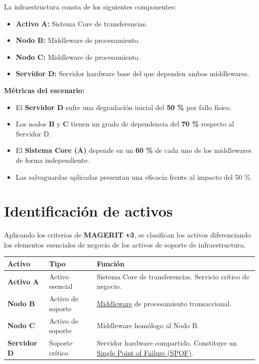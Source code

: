 \documentclass[11pt,a4paper]{article}
\begin{document}
La infraestructura consta de los siguientes componentes:
\begin{itemize}
    \item \textbf{Activo A:} Sistema Core de transferencias.
    \item \textbf{Nodo B:} Middleware de procesamiento.
    \item \textbf{Nodo C:} Middleware de procesamiento.
    \item \textbf{Servidor D:} Servidor hardware base del que dependen ambos middlewares.
\end{itemize}

\textbf{Métricas del escenario:}
\begin{itemize}
    \item El \textbf{Servidor D} sufre una degradación inicial del \textbf{50 \%} por fallo físico.
    \item Los nodos \textbf{B} y \textbf{C} tienen un grado de dependencia del \textbf{70 \%} respecto al Servidor D.
    \item El \textbf{Sistema Core (A)} depende en un \textbf{60 \%} de cada uno de los middlewares de forma independiente.
    \item Las salvaguardas aplicadas presentan una eficacia frente al impacto del 50 \%.
\end{itemize}

\pagebreak

\section*{Identificación de activos}
Aplicando los criterios de \textbf{MAGERIT v3}, se clasifican los activos diferenciando los elementos esenciales de negocio de los activos de soporte de infraestructura.

\begin{table}[h!]
    \small
    \centering
    \begin{tabularx}{\textwidth}{l l L}
        \toprule
        \textbf{Activo} & \textbf{Tipo} & \textbf{Función} \\
        \midrule
        \textbf{Activo A} & Activo esencial & Sistema Core de transferencias. Servicio crítico de negocio. \\
        \textbf{Nodo B} & Activo de soporte & \href{https://owasp.org/www-community/Application_Architecture}{Middleware} de procesamiento transaccional. \\
        \textbf{Nodo C} & Activo de soporte & Middleware homólogo al Nodo B. \\
        \textbf{Servidor D} & Soporte crítico & Servidor hardware compartido. Constituye un \href{https://en.wikipedia.org/wiki/Single_point_of_failure}{Single Point of Failure (SPOF)}. \\
        \bottomrule
    \end{tabularx}
\end{table}
\end{document}
